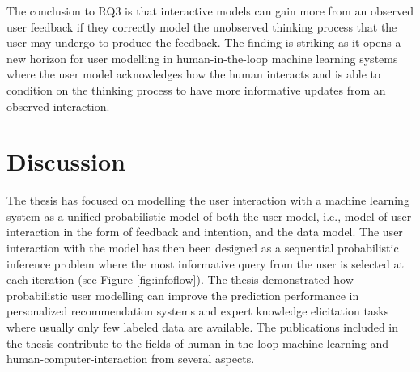 \documentclass[dissertation,math,vertlayout,pdfa,colorlinks]{aaltoseries}
\begin{document}
The conclusion to RQ3 is that interactive models can gain more from an observed user feedback if they correctly model the unobserved thinking process that the user may undergo to produce the feedback. The finding is striking as it opens a new horizon for user modelling in human-in-the-loop machine learning systems where the user model acknowledges how the human interacts and is able to condition on the thinking process to have more informative updates from an observed interaction.

\chapter{Discussion}

The thesis has focused on modelling the user interaction with a machine learning system as a unified probabilistic model of both the user model, i.e., model of user interaction in the form of feedback and intention, and the data model. The user interaction with the model has then been designed as a sequential probabilistic inference problem where the most informative query from the user is selected at each iteration (see Figure \ref{fig:infoflow}). The thesis demonstrated how probabilistic user modelling can improve the prediction performance in personalized recommendation systems and expert knowledge elicitation tasks where usually only few labeled data are available. The publications included in the thesis contribute to the fields of human-in-the-loop machine learning and human-computer-interaction from several aspects.


\end{document}
